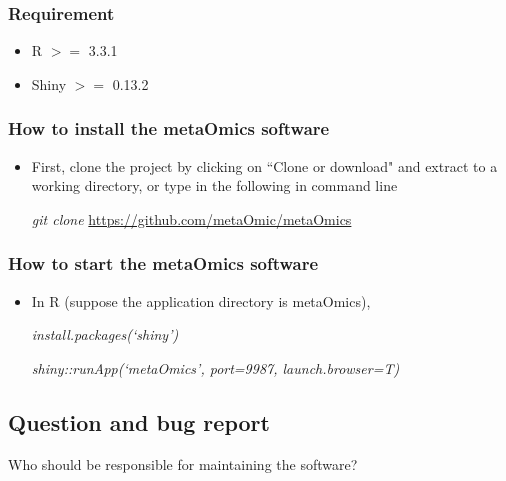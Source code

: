 \subsubsection{Requirement}
\begin{itemize}
\item R $>=$ 3.3.1
\item Shiny $>=$ 0.13.2
\end{itemize}

\subsubsection{How to install the metaOmics software}
\begin{itemize}
\item First, clone the project by
clicking on ``Clone or download" and extract to a working directory, 
or type in the following in command line

\textit{git clone} \url{https://github.com/metaOmic/metaOmics}
\end{itemize}

\subsubsection{How to start the metaOmics software}
\begin{itemize}
\item In R (suppose the application directory is metaOmics),

\textit{install.packages(`shiny')}

\textit{shiny::runApp(`metaOmics', port=9987, launch.browser=T)}
\end{itemize}


\subsection{Question and bug report}
{
\color{red}
Who should be responsible for maintaining the software?
}

 
